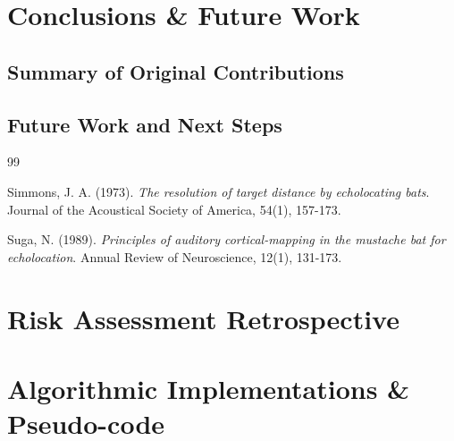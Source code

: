 \documentclass[12pt,a4paper]{report}
\begin{document}
\chapter{Conclusions \& Future Work}
\label{ch:conclusions}

\section{Summary of Original Contributions}

\section{Future Work and Next Steps}

\begin{thebibliography}{99}

Simmons, J. A. (1973). \emph{The resolution of target distance by echolocating bats}. Journal of the Acoustical Society of America, 54(1), 157-173.

Suga, N. (1989). \emph{Principles of auditory cortical-mapping in the mustache bat for echolocation}. Annual Review of Neuroscience, 12(1), 131-173.

\end{thebibliography}

\appendix
\chapter{Risk Assessment Retrospective}
\label{app:risk}

\chapter{Algorithmic Implementations \& Pseudo-code}
\label{app:code}
\end{document}
